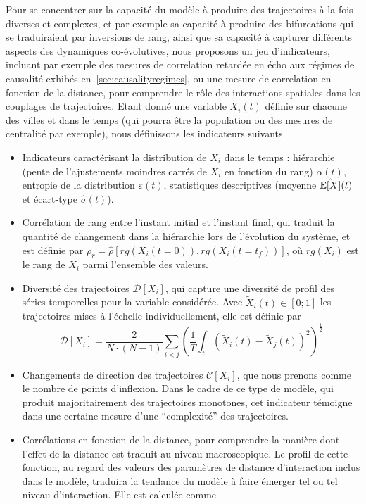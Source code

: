 Pour se concentrer sur la capacité du modèle à produire des trajectoires à la fois diverses et complexes, et par exemple sa capacité à produire des bifurcations qui se traduiraient par inversions de rang, ainsi que sa capacité à capturer différents aspects des dynamiques co-évolutives, nous proposons un jeu d'indicateurs, incluant par exemple des mesures de correlation retardée en écho aux régimes de causalité exhibés en~\ref{sec:causalityregimes}, ou une mesure de correlation en fonction de la distance, pour comprendre le rôle des interactions spatiales dans les couplages de trajectoires. Etant donné une variable $X_i(t)$ définie sur chacune des villes et dans le temps (qui pourra être la population ou des mesures de centralité par exemple), nous définissons les indicateurs suivants.

\begin{itemize}
  \item Indicateurs caractérisant la distribution de $X_i$ dans le temps : hiérarchie (pente de l'ajustements moindres carrés de $X_i$ en fonction du rang) $\alpha (t)$, entropie de la distribution $\varepsilon (t)$, statistiques descriptives (moyenne $\hat{\operatorname{\mathbb{E}}\!\left[X\right]} (t)$ et écart-type $\hat{\sigma} (t)$).
  \item Corrélation de rang entre l'instant initial et l'instant final, qui traduit la quantité de changement dans la hiérarchie lors de l'évolution du système, et est définie par $\rho_r = \hat{\rho}\left[rg(X_i(t=0)),rg(X_i(t=t_f))\right]$, où $rg(X_i)$ est le rang de $X_i$ parmi l'ensemble des valeurs.
  \item Diversité des trajectoires $\mathcal{D}\left[X_i\right]$, qui capture une diversité de profil des séries temporelles pour la variable considérée. Avec $\tilde{X}_i(t)\in \left[0;1\right]$ les trajectoires mises à l'échelle individuellement, elle est définie par
\[
\mathcal{D}\left[X_i\right] = \frac{2}{N\cdot(N-1)}\sum_{i<j} \left(\frac{1}{T}\int_{t} \left(\tilde{X}_i(t) - \tilde{X}_j(t)\right)^2 \right)^{\frac{1}{2}}
\]
\item Changements de direction des trajectoires $\mathcal{C}\left[X_i\right]$, que nous prenons comme le nombre de points d'inflexion. Dans le cadre de ce type de modèle, qui produit majoritairement des trajectoires monotones, cet indicateur témoigne dans une certaine mesure d'une ``complexité'' des trajectoires.
\item Corrélations en fonction de la distance, pour comprendre la manière dont l'effet de la distance est traduit au niveau macroscopique. Le profil de cette fonction, au regard des valeurs des paramètres de distance d'interaction inclus dans le modèle, traduira la tendance du modèle à faire émerger tel ou tel niveau d'interaction. Elle est calculée comme

\end{itemize}
